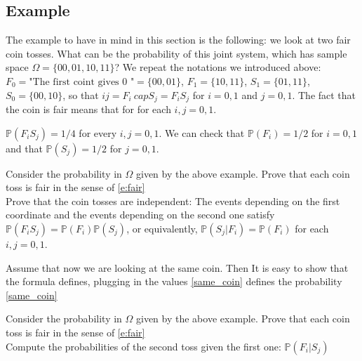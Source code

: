 \subsection{ Example}
\label{ss:examples}
The example to have in mind in this section is the following: we look at two fair coin tosses. What can be the probability of this joint system, which has sample space $\Omega  = \{00,01,10,11\}$? We repeat the notations we introduced above: $F_0 =\textrm{"The first coint gives 0 "} = \{00,01\}$,
$F_1 = \{10,11\}$,
$S_1 = \{01,11\}$, $S_0 = \{00,10\}$, 
so that $ij = F_i\ cap S_j = F_iS_j$ for $i = 0,1$ and $j = 0,1$. The fact that the coin is fair means that 
 for for each $i,j = 0,1$.

\begin{example}
$\mathbb P(F_iS_j) = 1/4$ for every $i,j = 0,1$. We can check that $\mathbb P(F_i) = 1/2$ for $i=0,1$ and that $\mathbb P(S_j) = 1/2$ for $j =0,1$. 
\end{example}
\begin{ExerciseList}
    \Exercise Consider the probability in $\Omega$ given by the above example. 
    \Question Prove that each coin toss is fair in the sense of \eqref{e:fair}\\
    \Question Prove that the coin tosses are independent: The events depending on the first coordinate and the events depending on the second one satisfy $\mathbb P(F_iS_j) = \mathbb P(F_i) \mathbb P(S_j)$, or equivalently, $\mathbb P(S_j|F_i) = \mathbb P(F_i)$ for each $i,j = 0,1$. 
\end{ExerciseList}
\begin{example}
Assume that now we are looking at the same coin. Then 
It is easy to show that the formula
defines, plugging in the values \eqref{same_coin}
defines the probability 
\eqref{same_coin}
\end{example}
\begin{ExerciseList}
    \Exercise Consider the probability in $\Omega$ given by the above example. 
    \Question Prove that each coin toss is fair in the sense of \eqref{e:fair}\\
    \Question Compute the probabilities of the second toss given the first one:  $\mathbb P(F_i|S_j) $ 
\end{ExerciseList}


